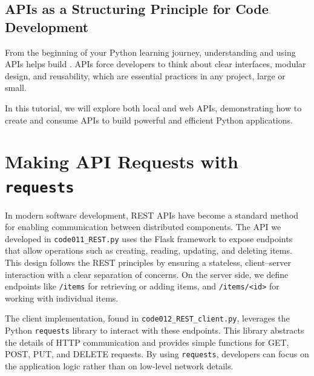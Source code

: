 %
\subsection{APIs as a Structuring Principle for Code Development}

From the beginning of your Python learning journey, understanding and using APIs helps build . APIs force developers to think about clear interfaces, modular design, and reusability, which are essential practices in any project, large or small.

In this tutorial, we will explore both local and web APIs, demonstrating how to create and consume APIs to build powerful and efficient Python applications.

%
\section{Making API Requests with \texttt{requests}}

In modern software development, REST APIs have become a standard method for enabling communication between distributed components. The API we developed in \texttt{code011\_REST.py} uses the Flask framework to expose endpoints that allow operations such as creating, reading, updating, and deleting items. This design follows the REST principles by ensuring a stateless, client–server interaction with a clear separation of concerns. On the server side, we define endpoints like \texttt{/items} for retrieving or adding items, and \texttt{/items/<id>} for working with individual items.

The client implementation, found in \texttt{code012\_REST\_client.py}, leverages the Python \texttt{requests} library to interact with these endpoints. This library abstracts the details of HTTP communication and provides simple functions for GET, POST, PUT, and DELETE requests. By using \texttt{requests}, developers can focus on the application logic rather than on low-level network details.

\bigskip

